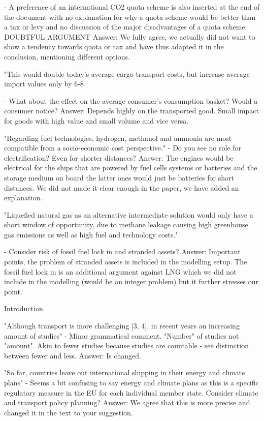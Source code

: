 -	A preference of an international CO2 quota scheme is also inserted at the end of the document with no explanation for why a quota scheme would be better than a tax or levy and no discussion of the major disadvantages of a quota scheme. DOUBTFUL ARGUMENT
Answer: We fully agree, we actually did not want to show a tendency towards quota or tax and have thus adapted it in the conclusion, mentioning different options.


"This would double today's average cargo transport costs, but increase average import values only by 6-8 %

-	What about the effect on the average consumer's consumption basket? Would a consumer notice?
Answer: Depends highly on the transported good. Small impact for goods with high value and small volume and vice versa.

"Regarding fuel technologies, hydrogen, methanol and ammonia are most compatible from a socio-economic cost perspective."
-	Do you see no role for electrification? Even for shorter distances?
Answer: The engines would be electrical for the ships that are powered by fuel cells systems or batteries and the storage medium on board the latter ones would just be batteries for short distances. We did not made it clear enough in the paper, we have added an explanation.

"Liquefied natural gas as an alternative intermediate solution would only have a short window of opportunity, due to methane leakage causing high greenhouse gas emissions as well as high fuel and technology costs."

-	Consider risk of fossil fuel lock in and stranded assets?
Answer: Important points, the problem of stranded assets is included in the modelling setup. The fossil fuel lock in is an additional argument against LNG which we did not include in the modelling (would be an integer problem) but it further stresses our point.

Introduction

 "Although transport is more challenging [3, 4], in recent years an increasing amount of studies"
-	Minor grammatical comment. "Number" of studies not "amount". Akin to fewer studies because studies are countable - see distinction between fewer and less.
Answer: Is changed.

"So far, countries leave out international shipping in their energy and climate plans"
-	Seems a bit confusing to say energy and climate plans as this is a specific regulatory measure in the EU for each individual member state. Consider climate and transport policy planning?
Answer: We agree that this is more precise and changed it in the text to your suggestion.

